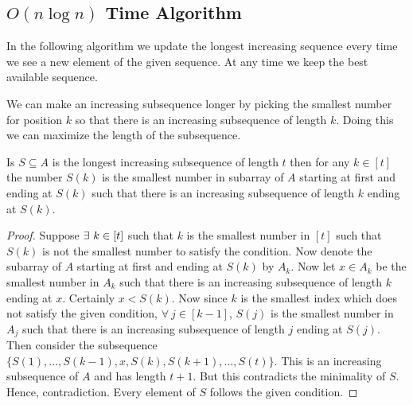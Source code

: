\subsection{\texorpdfstring{$O(n\log n)$}{O(logn)} Time Algorithm}
In the following algorithm we update the longest increasing sequence every time we see a new element of the given sequence. At any time we keep the best available sequence.
\begin{idea*}
	We can make an increasing subsequence longer by picking the smallest number for position $k$ so that there is an increasing subsequence of length $k$. Doing this we can maximize the length of the subsequence. 
\end{idea*}

\begin{Theorem}{}{}
	Is $S\subseteq A$ is the longest increasing subsequence of length $t$ then for any $k\in[t]$ the number $S(k)$ is the smallest number in subarray of $A$ starting at first  and ending at $S(k)$ such that there is an increasing subsequence of length $k$ ending at $S(k)$.
\end{Theorem}
\begin{proof}
	Suppose $\exs\ k\in[t]$ such that $k$ is the smallest number in $[t]$ such that $S(k)$ is not the smallest number to satisfy the condition. Now denote the subarray of $A$ starting at first  and ending at $S(k)$ by $A_k$. Now let $x\in A_k$ be the smallest number in $A_k$ such that there is an increasing subsequence of length $k$ ending at $x$. Certainly $x<S(k)$. Now since $k$ is the smallest index which does not satisfy the given condition, $\forall\ j\in[k-1]$, $S(j)$ is the smallest number in $A_j$ such that there is an increasing subsequence of length $j$ ending at $S(j)$. Then consider the subsequence $\{S(1),\dots, S(k-1),x,S(k),S(k+1),\dots, S(t)\}$. This is an increasing subsequence of $A$ and has length $t+1$. But this contradicts the minimality of $S$. Hence, contradiction. Every element of $S$ follows the given condition. 
\end{proof}

